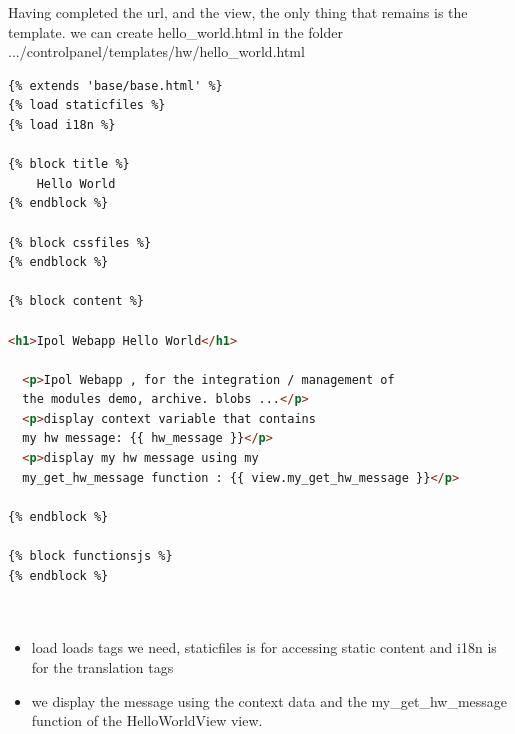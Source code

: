 Having completed the url, and the view, the only thing that remains is the template.
we can create hello\_world.html in the folder .../controlpanel/templates/hw/hello\_world.html

\begin{lstlisting}[language=html,firstnumber=1]
{% extends 'base/base.html' %}
{% load staticfiles %}
{% load i18n %}

{% block title %}
    Hello World
{% endblock %}

{% block cssfiles %}
{% endblock %}

{% block content %}

<h1>Ipol Webapp Hello World</h1>

  <p>Ipol Webapp , for the integration / management of 
  the modules demo, archive. blobs ...</p>
  <p>display context variable that contains 
  my hw message: {{ hw_message }}</p>
  <p>display my hw message using my 
  my_get_hw_message function : {{ view.my_get_hw_message }}</p>

{% endblock %}

{% block functionsjs %}
{% endblock %}

		
\end{lstlisting}

\begin{itemize}
\item  load loads tags we need, staticfiles is for accessing static content and i18n is for the translation tags
\item  we display the message using the context data and the my\_get\_hw\_message function of the HelloWorldView view.

\end{itemize}
